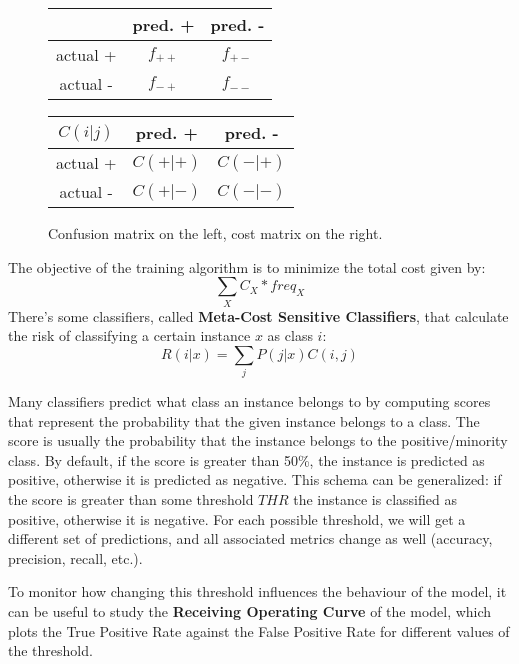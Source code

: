 \begin{figure}[H]
\centering
\begin{minipage}{0.49\textwidth}
    \begin{tabular}{|c||c|c|}
         \hline
         & pred. + & pred. - \\
        \hline
        \hline
        actual + & $f_{++}$ & $f_{+-}$\\
        \hline
        actual - & $f_{-+}$ & $f_{--}$\\
        \hline
    \end{tabular}
\end{minipage}
\hfill
\begin{minipage}{0.49\textwidth}
    \begin{tabular}{|c||c|c|}
         \hline
        $C(i|j)$ & pred. + & pred. - \\
        \hline
        \hline
        actual + & $C(+|+)$ & $C(-|+)$\\
        \hline
        actual - & $C(+|-)$ & $C(-|-)$\\
        \hline
    \end{tabular}
\end{minipage}
\caption{Confusion matrix on the left, cost matrix on the right.}
\end{figure}
The objective of the training algorithm is to minimize the total cost given by:
\begin{equation*}
    \sum_X C_X * freq_X
\end{equation*}
There's some classifiers, called \textbf{Meta-Cost Sensitive Classifiers}, that calculate the risk of classifying a certain instance $x$ as class $i$:
\begin{equation*}
    R(i|x) = \sum_j P(j|x)C(i,j)
\end{equation*}

Many classifiers predict what class an instance belongs to by computing scores that represent the probability that the given instance belongs to a class. The score is usually the probability that the instance belongs to the positive/minority class. By default, if the score is greater than 50\%, the instance is predicted as positive, otherwise it is predicted as negative. This schema can be generalized: if the score is greater than some threshold $THR$ the instance is classified as positive, otherwise it is negative. For each possible threshold, we will get a different set of predictions, and all associated metrics change as well (accuracy, precision, recall, etc.).

To monitor how changing this threshold influences the behaviour of the model, it can be useful to study the \textbf{Receiving Operating Curve} of the model, which plots the True Positive Rate against the False Positive Rate for different values of the threshold.